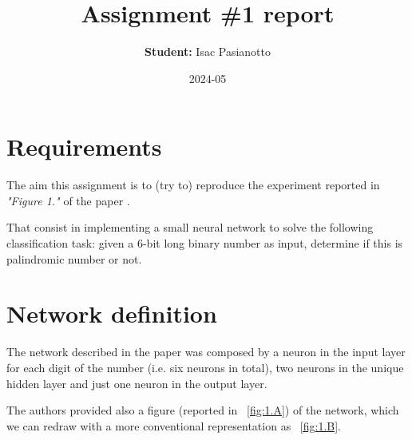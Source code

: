 \documentclass{article}
\title{Assignment \#1 report}
\author{\textbf{Student:} Isac Pasianotto}
\date{2024-05}
\begin{document}
    \maketitle

    \section{Requirements}\label{sec:requirements}

    The aim this assignment is to (try to) reproduce the experiment reported in \textit{"Figure 1."}
    of the paper \cite{Rumelhart1986LearningRB}.

    That consist in implementing a small neural network to solve the following classification task:
    given a 6-bit long binary number as input, determine if this is palindromic number or not.

    \section{Network definition}\label{sec:network-definition}

    The network described in the paper was composed by a neuron in the input layer for each digit of
    the number (i.e. six neurons in total), two neurons in the unique hidden layer and just one neuron
    in the output layer.

    \noindent The authors provided also a figure (reported in ~\ref{fig:1.A}) of the network, which we can
    redraw with a more conventional representation as ~\ref{fig:1.B}.
\end{document}
